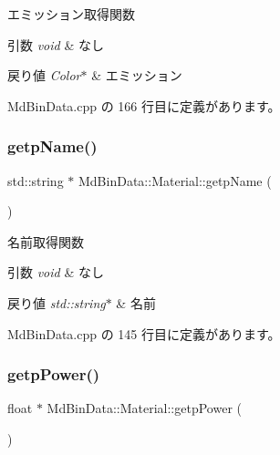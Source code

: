 エミッション取得関数 


\begin{DoxyParams}{引数}
{\em void} & なし \\
\hline
\end{DoxyParams}

\begin{DoxyRetVals}{戻り値}
{\em Color$\ast$} & エミッション \\
\hline
\end{DoxyRetVals}


 Md\+Bin\+Data.\+cpp の 166 行目に定義があります。

\mbox{\label{class_md_bin_data_1_1_material_abaa620135fd033cce415e7c949e9a4b6}} 
\subsubsection{\texorpdfstring{getp\+Name()}{getpName()}}
{\footnotesize\ttfamily std\+::string $\ast$ Md\+Bin\+Data\+::\+Material\+::getp\+Name (\begin{DoxyParamCaption}{ }\end{DoxyParamCaption})}



名前取得関数 


\begin{DoxyParams}{引数}
{\em void} & なし \\
\hline
\end{DoxyParams}

\begin{DoxyRetVals}{戻り値}
{\em std\+::string$\ast$} & 名前 \\
\hline
\end{DoxyRetVals}


 Md\+Bin\+Data.\+cpp の 145 行目に定義があります。

\mbox{\label{class_md_bin_data_1_1_material_a2fad1db40f8d9466ac87be3782149104}} 
\subsubsection{\texorpdfstring{getp\+Power()}{getpPower()}}
{\footnotesize\ttfamily float $\ast$ Md\+Bin\+Data\+::\+Material\+::getp\+Power (\begin{DoxyParamCaption}{ }\end{DoxyParamCaption})}



